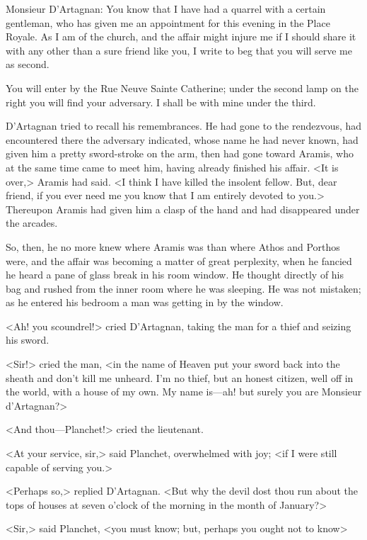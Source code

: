 \begin{mail}{}{Monsieur D'Artagnan:}
You know that I have had a quarrel with a certain gentleman, who has given me an appointment for this evening in the Place Royale. As I am of the church, and the affair might injure me if I should share it with any other than a sure friend like you, I write to beg that you will serve me as second.

You will enter by the Rue Neuve Sainte Catherine; under the second lamp on the right you will find your adversary. I shall be with mine under the third. 
\end{mail}

D'Artagnan tried to recall his remembrances. He had gone to the rendezvous, had encountered there the adversary indicated, whose name he had never known, had given him a pretty sword-stroke on the arm, then had gone toward Aramis, who at the same time came to meet him, having already finished his affair. <It is over,> Aramis had said. <I think I have killed the insolent fellow. But, dear friend, if you ever need me you know that I am entirely devoted to you.> Thereupon Aramis had given him a clasp of the hand and had disappeared under the arcades.

So, then, he no more knew where Aramis was than where Athos and Porthos were, and the affair was becoming a matter of great perplexity, when he fancied he heard a pane of glass break in his room window. He thought directly of his bag and rushed from the inner room where he was sleeping. He was not mistaken; as he entered his bedroom a man was getting in by the window.

<Ah! you scoundrel!> cried D'Artagnan, taking the man for a thief and seizing his sword.

<Sir!> cried the man, <in the name of Heaven put your sword back into the sheath and don't kill me unheard. I'm no thief, but an honest citizen, well off in the world, with a house of my own. My name is—ah! but surely you are Monsieur d'Artagnan?>

<And thou—Planchet!> cried the lieutenant.

<At your service, sir,> said Planchet, overwhelmed with joy; <if I were still capable of serving you.>

<Perhaps so,> replied D'Artagnan. <But why the devil dost thou run about the tops of houses at seven o'clock of the morning in the month of January?>

<Sir,> said Planchet, <you must know; but, perhaps you ought not to know\longdash>

